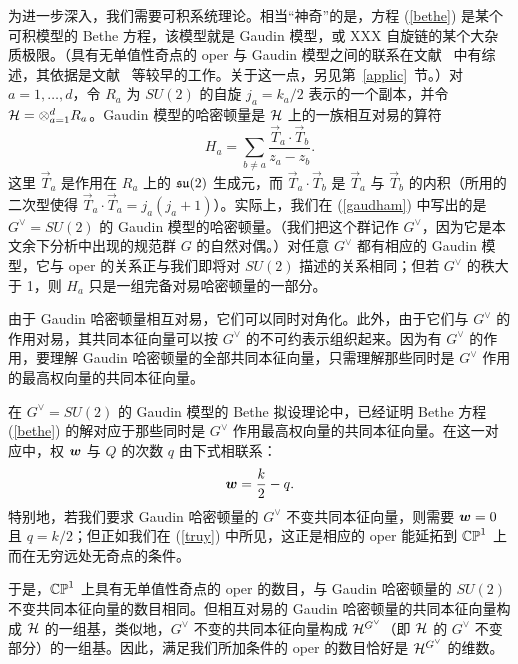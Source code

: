 为进一步深入，我们需要可积系统理论。相当“神奇”的是，方程 (\ref{bethe}) 是某个可积模型的 Bethe 方程，该模型就是 Gaudin 模型，或 XXX 自旋链的某个大杂质极限。（具有无单值性奇点的 oper 与 Gaudin 模型之间的联系在文献~\cite{Frenkel} 中有综述，其依据是文献~\cite{BF,FFR} 等较早的工作。关于这一点，另见第~\ref{applic}~节。）对 $a=1,\dots,d$，令 $R_a$ 为 $SU(2)$ 的自旋 $j_a=k_a/2$ 表示的一个副本，并令 $\H=\otimes_{a=1}^d R_a$。Gaudin 模型的哈密顿量是 $\H$ 上的一族相互对易的算符
\begin{equation}\label{gaudham}H_a=\sum_{b\not=a}\frac{\vec T_a\cdot \vec T_b}{z_a-z_b}.\end{equation}
这里 $\vec T_a$ 是作用在 $R_a$ 上的 $\frak{su}(2)$ 生成元，而 $\vec T_a\cdot\vec T_b$ 是 $\vec T_a$ 与 $\vec T_b$ 的内积（所用的二次型使得 $\vec T_a\cdot \vec T_a=j_a(j_a+1)$）。实际上，我们在 (\ref{gaudham}) 中写出的是 $G^\vee=SU(2)$ 的 Gaudin 模型的哈密顿量。（我们把这个群记作 $G^\vee$，因为它是本文余下分析中出现的规范群 $G$ 的自然对偶。）对任意 $G^\vee$ 都有相应的 Gaudin 模型，它与 oper 的关系正与我们即将对 $SU(2)$ 描述的关系相同；但若 $G^\vee$ 的秩大于 1，则 $H_a$ 只是一组完备对易哈密顿量的一部分。

由于 Gaudin 哈密顿量相互对易，它们可以同时对角化。此外，由于它们与 $G^\vee$ 的作用对易，其共同本征向量可以按 $G^\vee$ 的不可约表示组织起来。因为有 $G^\vee$ 的作用，要理解 Gaudin 哈密顿量的全部共同本征向量，只需理解那些同时是 $G^\vee$ 作用的最高权向量的共同本征向量。

在 $G^\vee=SU(2)$ 的 Gaudin 模型的 Bethe 拟设理论中，已经证明 Bethe 方程 (\ref{bethe}) 的解对应于那些同时是 $G^\vee$ 作用最高权向量的共同本征向量。在这一对应中，权 $\cmmib w$ 与 $Q$ 的次数 $q$ 由下式相联系：
\begin{equation}\label{duflo} \cmmib w=\frac{k}{2}-q.\end{equation}
特别地，若我们要求 Gaudin 哈密顿量的 $G^\vee$ 不变共同本征向量，则需要 $\cmmib w=0$ 且 $q=k/2$；但正如我们在 (\ref{truy}) 中所见，这正是相应的 oper 能延拓到 $\CP^1$ 上而在无穷远处无奇点的条件。

于是，$\CP^1$ 上具有无单值性奇点的 oper 的数目，与 Gaudin 哈密顿量的 $SU(2)$ 不变共同本征向量的数目相同。但相互对易的 Gaudin 哈密顿量的共同本征向量构成 $\H$ 的一组基，类似地，$G^\vee$ 不变的共同本征向量构成 $\H^{G^\vee}$（即 $\H$ 的 $G^\vee$ 不变部分）的一组基。因此，满足我们所加条件的 oper 的数目恰好是 $\H^{G^\vee}$ 的维数。

